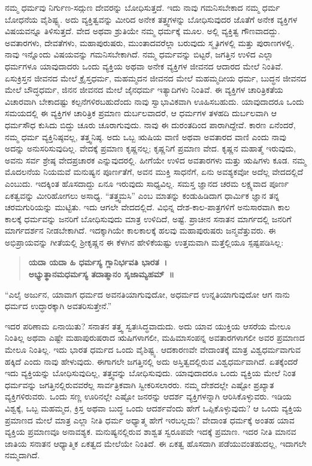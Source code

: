 ನಮ್ಮ ಧರ್ಮವು ನಿರ್ಗುಣ-ಸದ್ಗುಣ ದೇವರನ್ನು ಬೋಧಿಸುತ್ತದೆ. ಇದು ನಾವು ಗಮನಿಸಬೇಕಾದ ನಮ್ಮ ಧರ್ಮ ಬೋಧನೆಯ ವೈಶಿಷ್ಟ್ಯ. ಅದು ವ್ಯಕ್ತಿತ್ವವನ್ನು ಮೀರಿದ ಅನೇಕ ತತ್ತ್ವಗಳನ್ನು ಬೋಧಿಸುವುದರ ಜೊತೆಗೆ ಅನೇಕ ವ್ಯಕ್ತಿಗಳ ವಿಷಯವನ್ನೂ ತಿಳಿಸುತ್ತದೆ. ವೇದ ಅಥವಾ ಶ್ರುತಿಯೇ ನಮ್ಮ ಧರ್ಮಕ್ಕೆ ಮೂಲ. ಅಲ್ಲಿ ವ್ಯಕ್ತಿತ್ವ ಗೌಣವಾದದ್ದು. ಅವತಾರಗಳು, ದೇವತೆಗಳು, ಮಹಾಪುರುಷರು, ಮುಂತಾದವರೆಲ್ಲಾ ಬರುವುದು ಸ್ಮೃತಿಗಳಲ್ಲಿ ಮತ್ತು ಪುರಾಣಗಳಲ್ಲಿ. ನಾವು ಇನ್ನೊಂದು ವಿಷಯವನ್ನು ಗಮನಿಸಬೇಕಾಗಿದೆ. ನಮ್ಮ ಧರ್ಮವನ್ನು ಬಿಟ್ಟರೆ, ಜಗತ್ತಿನ ಉಳಿದ ಎಲ್ಲಾ ಧರ್ಮಗಳೂ ಯಾವುದಾದರು ಒಂದು ವ್ಯಕ್ತಿಯ ಅಥವಾ ಅನೇಕ ವ್ಯಕ್ತಿಗಳ ಜೀವನದ ಆದಾರದ ಮೇಲೆ ನಿಂತಿವೆ. ಏಸುಕ್ರಿಸ್ತನ ಜೀವನದ ಮೇಲೆ ಕ್ರೈಸ್ತಧರ್ಮ, ಮಹಮ್ಮದನ ಜೀವನದ ಮೇಲೆ ಮಹಮ್ಮದೀಯ ಧರ್ಮ, ಬುದ್ಧನ ಜೀವನದ ಮೇಲೆ ಬೌದ್ಧಧರ್ಮ, ಜಿನನ ಜೀವನದ ಮೇಲೆ ಜೈನಧರ್ಮ ಇತ್ಯಾದಿಗಳು ನಿಂತಿವೆ. ಈ ವ್ಯಕ್ತಿಗಳ ಚಾರಿತ್ರಿಕತೆಯ ವಿಚಾರವಾಗಿ ಬೇಕಾದಷ್ಟು ಕಲ್ಪನೆಗಳಿರಬಹುದೆಂದು ನಾವು ಸ್ವಾಭಾವಿಕವಾಗಿ ಊಹಿಸಬಹುದು. ಯಾವುದಾದರೂ ಒಂದು ಸಮಯದಲ್ಲಿ ಈ ವ್ಯಕ್ತಿಗಳ ಚಾರಿತ್ರಿಕ ಪ್ರಮಾಣ ದುರ್ಬಲವಾದರೆ, ಆ ಧರ್ಮಗಳ ತಳಹದಿ ದುರ್ಬಲವಾಗಿ ಆ ಧರ್ಮಸೌಧ ಕುಸಿದು ಬಿದ್ದು ಚೂರು ಚೂರಾಗುವುದು. ನಾವು ಈ ದುರಂತದಿಂದ ಪಾರಾಗಿದ್ದೇವೆ. ಕಾರಣ ಏನೆಂದರೆ, ನಮ್ಮ ಧರ್ಮ ವ್ಯಕ್ತಿನಿಷ್ಠವಲ್ಲ, ತತ್ತ್ವನಿಷ್ಠ. ಅದು ಒಬ್ಬ ಋಷಿಯ ವಾಣಿ ಅಥವಾ ಅವತಾರದ ವಾಣಿ ಎಂದು ನಾವು ಅದನ್ನು ಅನುಸರಿಸುವುದಿಲ್ಲ. ವೇದಕ್ಕೆ ಪ್ರಮಾಣ ಕೃಷ್ಣನಲ್ಲ; ಕೃಷ್ಣನಿಗೆ ಪ್ರಮಾಣ ವೇದ. ಕೃಷ್ಣನ ಮಹಾತ್ಮೆ ಇರುವುದು, ಅವನು ಸರ್ವ ಶ್ರೇಷ್ಠ ವೇದಪ್ರಚಾರಕ ಎನ್ನುವುದರಲ್ಲಿ. ಹೀಗೆಯೇ ಉಳಿದ ಅವತಾರಗಳು ಮತ್ತು ಋಷಿಗಳು ಕೂಡ. ನಮ್ಮ ಮೊದಲನೆಯ ನಿಯಮವೆ ಮನುಷ್ಯನ ಪೂರ್ಣತೆಗೆ, ಅವನ ಮುಕ್ತಿ ಸಾಧನೆಗೆ, ಏನು ಅವಶ್ಯಕವೋ ಅದೆಲ್ಲ ವೇದದಲ್ಲಿದೆ ಎಂಬುದು. ಇದಕ್ಕಿಂತ ಹೊಸದಾದ್ದು ಏನೂ ಇರುವುದು ಸಾಧ್ಯವಿಲ್ಲ. ಸಮಸ್ತ ಜ್ಞಾನದ ಚರಮ ಲಕ್ಷ್ಯವಾದ ಪೂರ್ಣ ಏಕತ್ವವನ್ನು ಮೀರಿಹೋಗಲು ಅಸಾಧ್ಯ. “ತತ್ತ್ವಮಸಿ” ಎಂಬ ಮಾತನ್ನು ಕಂಡುಹಿಡಿದಾಗ ಧಾರ್ಮಿಕ ಜ್ಞಾನ ತನ್ನ ಚರಮಗುರಿಯನ್ನು ಮುಟ್ಟಿತು. ಇದು ಆಗಲೇ ವೇದದಲ್ಲಿದೆ. ವಿಭಿನ್ನ ದೇಶ-ಕಾಲ-ಪಾತ್ರಗಳಿಗೆ ಅನುಸಾರವಾಗಿ ಕಾಲ ಕಾಲಕ್ಕೆ ಧರ್ಮವನ್ನು ಜನರಿಗೆ ಬೋಧಿಸುವುದು ಮಾತ್ರ ಉಳಿದಿದೆ, ಅಷ್ಟೆ. ಪ್ರಾಚೀನ ಸನಾತನ ಮಾರ್ಗದಲ್ಲಿ ಜನರಿಗೆ ಮಾರ್ಗದರ್ಶನ ನೀಡಬೇಕಾಗಿದೆ. ಇದಕ್ಕಾಗಿಯೇ ಕಾಲಕಾಲಕ್ಕೆ ಹಲವು ಮಹಾಪುರುಷರು ಜನ್ಮವೆತ್ತುವರು. ಈ ಅಭಿಪ್ರಾಯವನ್ನು ಗೀತೆಯಲ್ಲಿ ಶ‍್ರೀಕೃಷ್ಣನ ಈ ಕೆಳಗಿನ ಹೇಳಿಕೆಯಷ್ಟು ಉತ್ತಮವಾಗಿ ಮತ್ತೆಲ್ಲಿಯೂ ಸ್ಪಷ್ಟಪಡಿಸಿಲ್ಲ:

\begin{verse}
\textbf{ಯದಾ ಯದಾ ಹಿ ಧರ್ಮಸ್ಯ ಗ್ಲಾನಿರ್ಭವತಿ ಭಾರತ~।}\\\textbf{ಅಭ್ಯುತ್ಥಾನಮಧರ್ಮಸ್ಯ ತದಾತ್ಮಾನಂ ಸೃಜಾಮ್ಯಹಮ್​~॥}
\end{verse}

“ಎಲೈ ಅರ್ಜುನ, ಯಾವಾಗ ಧರ್ಮದ ಅವನತಿಯಾಗುವುದೋ, ಅಧರ್ಮದ ಉನ್ನತಿಯಾಗುವುದೋ ಆಗ ನಾನು ಧರ್ಮದ ಉದ್ಧಾರಕ್ಕಾಗಿ ಅವತರಿಸುತ್ತೇನೆ.”

ಇದರ ಪರಿಣಾಮ ಏನಾಯಿತು? ಸನಾತನ ತತ್ತ್ವ ಸ್ವತಃಸಿದ್ಧವಾದುದು. ಅದು ಯಾವ ಯುಕ್ತಿಯ ಆಸರೆಯ ಮೇಲೂ ನಿಂತಿಲ್ಲ ಅಥವಾ ಎಷ್ಟೇ ಮಹಾಪುರುಷರಾದ ಋಷಿಗಳಾಗಲೀ, ಮಹಿಮಾಸಂಪನ್ನ ಅವತಾರಗಳಾಗಲೀ ಅವರ ಪ್ರಮಾಣದ ಮೇಲೂ ನಿಂತಿಲ್ಲ. ಇದು ಭಾರತ ಧರ್ಮದ ಒಂದು ವೈಶಿಷ್ಟ್ಯ. ಆದಕಾರಣವೇ ವೇದಾಂತಕ್ಕೆ ಮಾತ್ರ ವಿಶ್ವಧರ್ಮವಾಗುವ ಹಕ್ಕಿದೆ ಎಂದು ನಾವು ಹೇಳುವುದು. ಈಗಾಗಲೇ ಜಗತ್ತಿನಲ್ಲಿ ಅದು ಅಸ್ತಿತ್ವದಲ್ಲಿರುವ ವಿಶ್ವಧರ್ಮವಾಗಿದೆ. ಏತಕ್ಕೆಂದರೆ ಇದು ವ್ಯಕ್ತಿಯನ್ನು ಬೋಧಿಸುವುದಿಲ್ಲ, ತತ್ತ್ವವನ್ನು ಬೋಧಿಸುವುದು. ಯಾವುದಾದರೂ ಒಂದು ವ್ಯಕ್ತಿಯ ಮೇಲೆ ನಿಂತ ಧರ್ಮವನ್ನು ಜಗತ್ತಿನಲ್ಲಿರುವವರೆಲ್ಲ ಸಾರ್ವತ್ರಿಕವಾಗಿ ಸ್ವೀಕರಿಸಲಾರರು. ನಮ್ಮ ದೇಶದಲ್ಲೇ ಎಷ್ಟೋ ಪ್ರಖ್ಯಾತ ವ್ಯಕ್ತಿಗಳಿರುವರು. ಒಂದು ಸಣ್ಣ ಊರಿನಲ್ಲೇ ಎಷ್ಟೋ ಜನರನ್ನು ಆದರ್ಶ ವ್ಯಕ್ತಿಗಳನ್ನಾಗಿ ಆರಿಸಿಕೊಳ್ಳುವರು. ಇಡಿಯ ವಿಶ್ವಕ್ಕೆ, ಒಬ್ಬ ಮಹಮ್ಮದ, ಕ್ರಿಸ್ತ ಅಥವಾ ಬುದ್ಧ ಒಂದು ಆದರ್ಶವೆಂದು ಹೇಗೆ ಒಪ್ಪಿಕೊಳ್ಳುವುದು? ಆ ಒಂದು ವ್ಯಕ್ತಿಯ ಪ್ರಮಾಣದ ಮೇಲೆ ಮಾತ್ರ ಎಲ್ಲಾ ನೀತಿ ಧರ್ಮ ಅಧ್ಯಾತ್ಮ ಹೇಗೆ ಇರಬಲ್ಲದು? ವೇದಾಂತ ಧರ್ಮಕ್ಕೆ ಅಂತಹ ಯಾವ ವ್ಯಕ್ತಿಯ ಪ್ರಮಾಣವೂ ಅನಾವಶ್ಯಕ. ಮನುಷ್ಯನಲ್ಲಿರುವ ಶಾಶ್ವತ ಸ್ವರೂಪವೇ ಇದಕ್ಕೆ ಪ್ರಮಾಣ. ಇದರ ನೀತಿ ಮಾನವ ಜಾತಿಯ ಸನಾತನ ಆಧ್ಯಾತ್ಮಿಕ ಏಕತ್ವದ ಮೇಲೆಯೇ ನಿಂತಿದೆ. ಈ ಏಕತ್ವ ಹೊಸದಾಗಿ ಪಡೆಯುವಂತಹುದಲ್ಲ, ಇದಾಗಲೇ ನಮ್ಮದಾಗಿದೆ.

